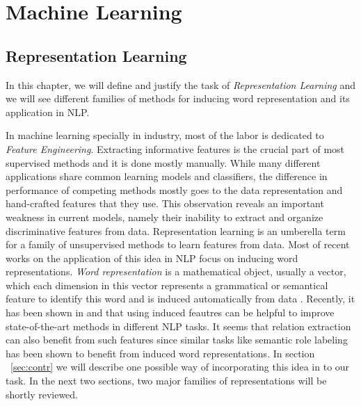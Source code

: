\chapter{Machine Learning}

\section{Representation Learning}
\label {ch:repr-learning}

In this chapter, we will define and justify the task of
\emph{Representation Learning} and we will see different families of methods for
inducing word representation and its application in NLP.

In machine learning specially in industry, most of the labor is dedicated to
\emph{Feature Engineering}. Extracting informative features is the crucial part
of most supervised methods and it is done mostly manually. While many different
applications share common learning models and classifiers, the difference in
performance of competing methods mostly goes to the data representation and
hand-crafted features that they use. This observation reveals an important
weakness in current models, namely their inability to extract and organize
discriminative features from data. Representation learning is an umberella term
for a family of unsupervised methods to learn features from data. Most of recent
works on the application of this idea in NLP focus on inducing word
representations. \emph{Word representation} is a mathematical object, usually a
vector, which each dimension in this vector represents a grammatical or
semantical feature to identify this word and is induced automatically from data
\cite{Turian2010b}. Recently, it has been shown in \cite{Turian2010b} and \cite{Collobert2011} that using
 induced feautres can be helpful to improve state-of-the-art methods in 
different NLP tasks. It seems that relation extraction can also benefit from such features since similar tasks like 
semantic role labeling has been shown to benefit from
induced word representations. In section ~\ref{sec:contr} we will describe one
possible way of incorporating this idea in to our task. In the next two sections, two major
families of representations will be shortly reviewed.


